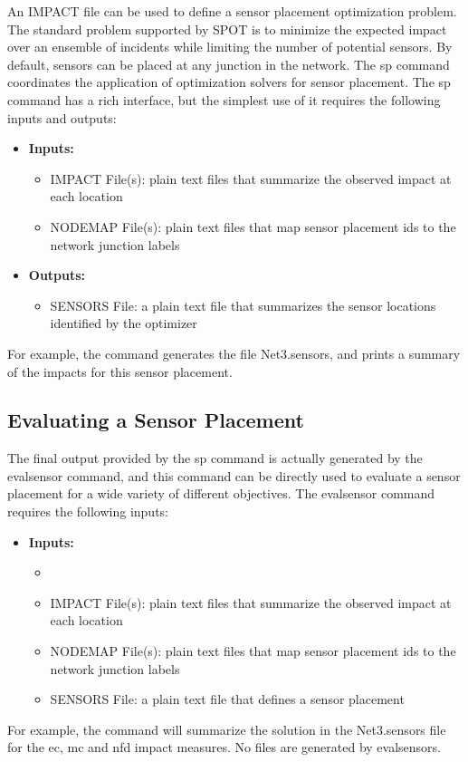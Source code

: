 An IMPACT file can be used to define a sensor placement optimization problem. The standard problem supported by SPOT is to minimize the expected impact over an ensemble of incidents while limiting the number of potential sensors. By default, sensors can be placed at any junction in the network. The {\ttfamily sp} command coordinates the application of optimization solvers for sensor placement. The {\ttfamily sp} command has a rich interface, but the simplest use of it requires the following inputs and outputs: 
\begin{itemize}
\item {\bfseries Inputs:} 
\begin{itemize}
\item IMPACT File(s): plain text files that summarize the observed impact at each location 
\item NODEMAP File(s): plain text files that map sensor placement ids to the network junction labels 
\end{itemize}
\item {\bfseries Outputs:} 
\begin{itemize}
\item SENSORS File: a plain text file that summarizes the sensor locations identified by the optimizer 
\end{itemize}
\end{itemize}For example, the command 
generates the file {\ttfamily Net3.sensors}, and prints a summary of the impacts for this sensor placement.

\subsection{Evaluating a Sensor Placement}\label{example_gStartedEVALSENSOR}

The final output provided by the {\ttfamily sp} command is actually generated by the {\ttfamily evalsensor} command, and this command can be directly used to evaluate a sensor placement for a wide variety of different objectives. The {\ttfamily evalsensor} command requires the following inputs: 
\begin{itemize}
\item {\bfseries Inputs:} 
\begin{itemize}
\item 
\item IMPACT File(s): plain text files that summarize the observed impact at each location 
\item NODEMAP File(s): plain text files that map sensor placement ids to the network junction labels 
\item SENSORS File: a plain text file that defines a sensor placement 
\end{itemize}
\end{itemize}For example, the command
will summarize the solution in the {\ttfamily Net3.sensors} file for the {\ttfamily ec}, {\ttfamily mc} and {\ttfamily nfd} impact measures. No files are generated by {\ttfamily evalsensors}.

